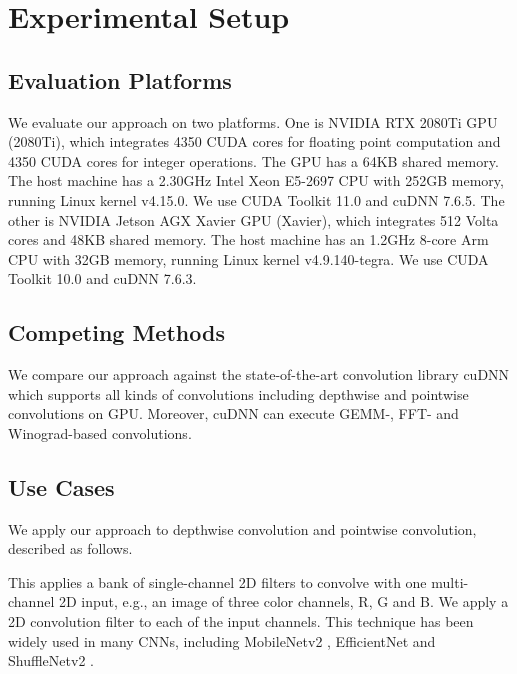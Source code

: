 

\section{Experimental Setup}

\subsection{Evaluation Platforms} We evaluate our approach on two platforms. 
One is NVIDIA RTX 2080Ti GPU (2080Ti), which integrates 4350 CUDA cores for floating point computation and 4350 CUDA cores for integer operations. 
The GPU has a 64KB shared memory. 
The host machine has a 2.30GHz Intel Xeon E5-2697 CPU with 252GB memory, running Linux kernel v4.15.0. We use CUDA Toolkit 11.0 and cuDNN 7.6.5.
The other is NVIDIA Jetson AGX Xavier GPU (Xavier), which integrates 512 Volta cores and 48KB shared memory.
The host machine has an 1.2GHz 8-core Arm CPU with 32GB memory, running Linux kernel v4.9.140-tegra. We use CUDA Toolkit 10.0 and cuDNN 7.6.3. 


\subsection{Competing Methods} We compare our approach against the state-of-the-art convolution library cuDNN which supports all kinds of convolutions including depthwise and pointwise convolutions on GPU. 
  Moreover, cuDNN can execute GEMM-, FFT- and Winograd-based convolutions. 


\subsection{Use Cases}
We apply our approach to depthwise convolution and pointwise convolution, described as follows.

 This applies a bank of single-channel 2D filters to convolve with one multi-channel 2D input, e.g., an image of three color channels, R, G and B. We apply a 2D convolution filter to each of the input channels. 
This technique has been widely used in many CNNs, including MobileNetv2 \cite{Sandler_2018_CVPR}, EfficientNet \cite{tan2019efficientnet} and ShuffleNetv2 \cite{Ma_2018_ECCV}.

